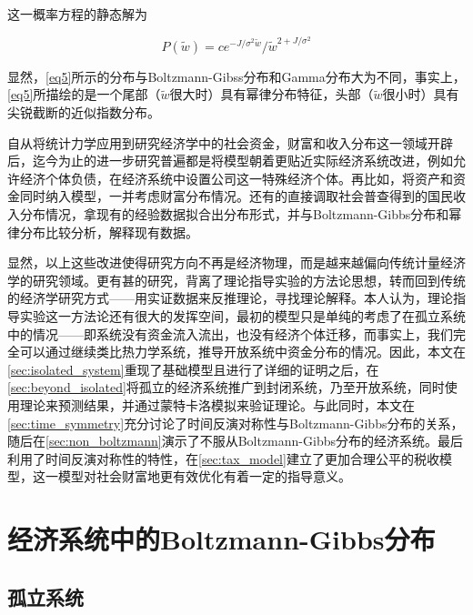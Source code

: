 \documentclass[tsinghuacite]{HustGraduPaper}
\begin{document}
			\vspace{2em}
	
			这一概率方程的静态解为
	
			\begin{equation}
				P(\tilde{w}) = c e^{- J / \sigma^2 \tilde{w}}  / \tilde{w}^{2 + J/\sigma^2}  \label{eq5}
			\end{equation}
	
			\vspace{2em}
	
			显然，\eqref{eq5}所示的分布与Boltzmann-Gibss分布和Gamma分布大为不同，事实上，\eqref{eq5}所描绘的是一个尾部（$\tilde{w}$很大时）具有幂律分布特征，头部（$\tilde{w}$很小时）具有尖锐截断的近似指数分布。
	
	
			自从将统计力学应用到研究经济学中的社会资金，财富和收入分布这一领域开辟后，迄今为止的进一步研究普遍都是将模型朝着更贴近实际经济系统改进，例如允许经济个体负债，在经济系统中设置公司这一特殊经济个体。再比如，将资产和资金同时纳入模型，一并考虑财富分布情况。还有的直接调取社会普查得到的国民收入分布情况，拿现有的经验数据拟合出分布形式，并与Boltzmann-Gibbs分布和幂律分布比较分析，解释现有数据。
	
			显然，以上这些改进使得研究方向不再是经济物理，而是越来越偏向传统计量经济学的研究领域。更有甚的研究，背离了理论指导实验的方法论思想，转而回到传统的经济学研究方式——用实证数据来反推理论，寻找理论解释。本人认为，理论指导实验这一方法论还有很大的发挥空间，最初的模型只是单纯的考虑了在孤立系统中的情况——即系统没有资金流入流出，也没有经济个体迁移，而事实上，我们完全可以通过继续类比热力学系统，推导开放系统中资金分布的情况。因此，本文在\autoref{sec:isolated_system}重现了基础模型且进行了详细的证明之后，在\autoref{sec:beyond_isolated}将孤立的经济系统推广到封闭系统，乃至开放系统，同时使用理论来预测结果，并通过蒙特卡洛模拟来验证理论。与此同时，本文在\autoref{sec:time_symmetry}充分讨论了时间反演对称性与Boltzmann-Gibbs分布的关系，随后在\autoref{sec:non_boltzmann}演示了不服从Boltzmann-Gibbs分布的经济系统。最后利用了时间反演对称性的特性，在\autoref{sec:tax_model}建立了更加合理公平的税收模型，这一模型对社会财富地更有效优化有着一定的指导意义。



	\newpage
	
	
	\section{经济系统中的Boltzmann-Gibbs分布}\label{sec:isolated_system}
	
		\subsection{孤立系统}
	
\end{document}

